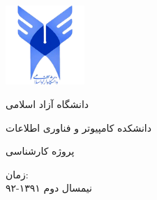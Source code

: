 \thispagestyle{empty}
\begin{center}
\vspace{-2cm}\centerline{{\includegraphics[height=3cm]{logo.png}}}
\Titrh دانشگاه آزاد اسلامی\\
\par\vspace{9mm}
\Titrc دانشکده کامپیوتر و فناوری اطلاعات \\
\par\vspace{9mm}
\Titrc پروژه کارشناسی \\
\par\vspace{9mm}
\Titrc زمان: \\
\Yagut نیمسال دوم ۱۳۹۱-۹۲
\end {center}
\newpage
